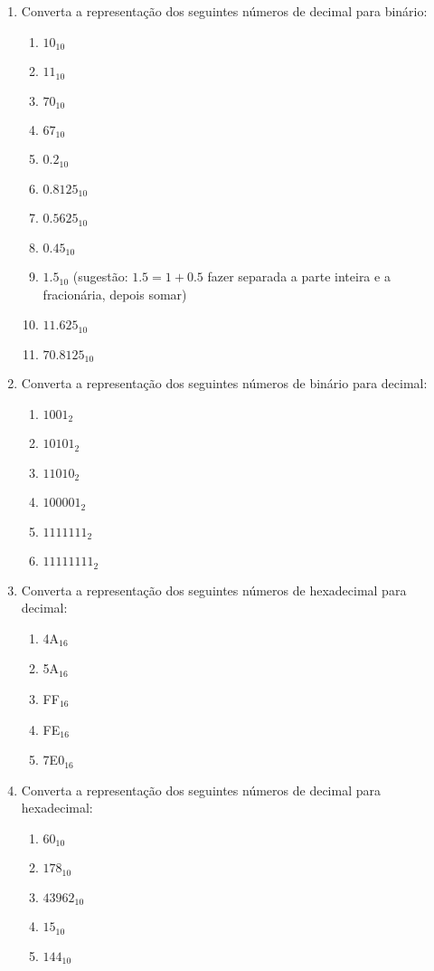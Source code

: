 \documentclass[a4paper]{article}
\begin{document}
\begin{enumerate}
\item Converta a representação dos seguintes números de decimal para binário:

  \begin{enumerate}
  \item $10_{10}$ %
  \item $11_{10}$ %
  \item $70_{10}$ %
  \item $67_{10}$ %
  \item $0.2_{10}$ %
  \item $0.8125_{10}$ %
  \item $0.5625_{10}$ %
  \item $0.45_{10}$ %
  \item $1.5_{10}$ (sugestão: $1.5 = 1 + 0.5$ fazer separada a parte
    inteira e a fracionária, depois somar) %
  \item $11.625_{10}$ %
  \item $70.8125_{10}$ %
  \end{enumerate}

\item Converta a representação dos seguintes números de binário para
  decimal:
  \begin{enumerate}
  \item $1001_2$ %
  \item $10101_2$ %
  \item $11010_2$ %
  \item $100001_2$ %
  \item $1111111_2$ %
  \item $11111111_2$ %
  \end{enumerate}

\item Converta a representação dos seguintes números de hexadecimal
  para decimal:
  \begin{enumerate}
  \item 4A$_{16}$ %
  \item 5A$_{16}$ %
  \item FF$_{16}$ %
  \item FE$_{16}$ %
  \item 7E0$_{16}$ %
  \end{enumerate}

\item Converta a representação dos seguintes números de decimal para
  hexadecimal:
  \begin{enumerate}
  \item $60_{10}$ %
  \item $178_{10}$ %
  \item $43962_{10}$ %
  \item $15_{10}$ %
  \item $144_{10}$ %
  \end{enumerate}
\end{enumerate}
\end{document}
